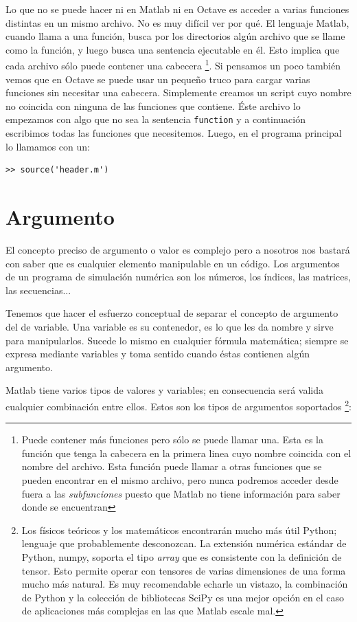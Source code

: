 Lo que no se puede hacer ni en Matlab ni en Octave es acceder a varias
funciones distintas en un mismo archivo. No es muy difícil ver por
qué. El lenguaje Matlab, cuando llama a una función, busca por los
directorios algún archivo que se llame como la función, y luego busca
una sentencia ejecutable en él. Esto implica que cada archivo sólo
puede contener una cabecera%
\footnote{Puede contener más funciones pero sólo se puede llamar una.
  Esta es la función que tenga la cabecera en la primera linea cuyo
  nombre coincida con el nombre del archivo. Esta función puede llamar
  a otras funciones que se pueden encontrar en el mismo archivo, pero
  nunca podremos acceder desde fuera a las \emph{subfunciones} puesto
  que Matlab no tiene información para saber donde se encuentran%
}. Si pensamos un poco también vemos que en Octave se puede usar un
pequeño truco para cargar varias funciones sin necesitar una cabecera.
Simplemente creamos un script cuyo nombre no coincida con ninguna de
las funciones que contiene. Éste archivo lo empezamos con algo que no
sea la sentencia \texttt{function} y a continuación escribimos todas
las funciones que necesitemos. Luego, en el programa principal lo
llamamos con un:

\begin{verbatim}
>> source('header.m')
\end{verbatim}

\section{Argumento}

El concepto preciso de argumento o valor es complejo pero a nosotros
nos bastará con saber que es cualquier elemento manipulable en un
código.  Los argumentos de un programa de simulación numérica son los
números, los índices, las matrices, las secuencias...

Tenemos que hacer el esfuerzo conceptual de separar el concepto de
argumento del de variable. Una variable es su contenedor, es lo que
les da nombre y sirve para manipularlos. Sucede lo mismo en cualquier
fórmula matemática; siempre se expresa mediante variables y toma
sentido cuando éstas contienen algún argumento.

Matlab tiene varios tipos de valores y variables; en consecuencia será
valida cualquier combinación entre ellos. Estos son los tipos de
argumentos soportados%
\footnote{Los físicos teóricos y los matemáticos encontrarán mucho más
  útil Python; lenguaje que probablemente desconozcan. La extensión
  numérica estándar de Python, numpy, soporta el tipo \emph{array}
  que es consistente con la definición de tensor. Esto permite operar
  con tensores de varias dimensiones de una forma mucho más natural.
  Es muy recomendable echarle un vistazo, la combinación de Python y
  la colección de bibliotecas SciPy es una mejor opción en el caso de
  aplicaciones más complejas en las que Matlab escale mal.%
}:



